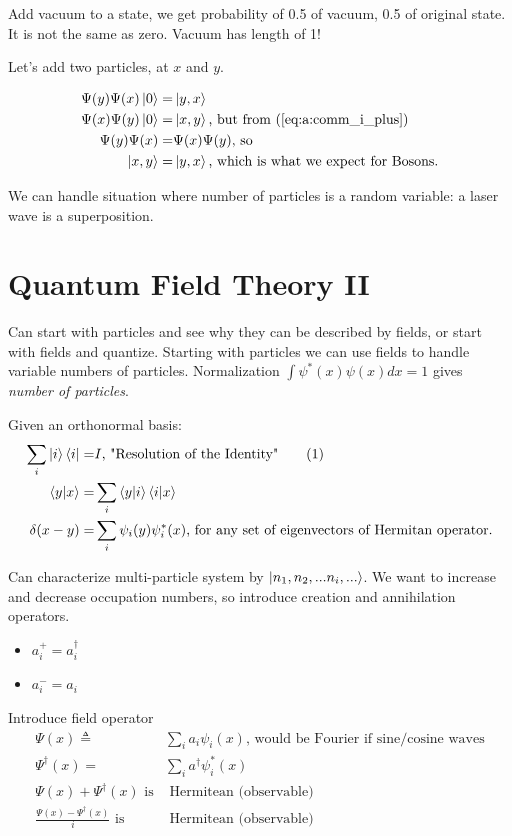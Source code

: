 \documentclass[]{article}
\newcommand\numberthis{\addtocounter{equation}{1}\tag{\theequation}}
\begin{document}
Add vacuum to a state, we get probability of 0.5 of vacuum, 0.5 of original state. It is not the same as zero. Vacuum has length of 1!

Let's add two particles, at $x$ and $y$. 
 
\begin{align*}
\Psi(y)\Psi(x)\ket{0} =& \ket{y,x}\\
\Psi(x)\Psi(y)\ket{0} =& \ket{x,y} \text{, but from (\ref {eq:a:comm_i_plus})}\\
\Psi(y)\Psi(x) =& \Psi(x)\Psi(y) \text{, so}\\
\ket{x,y} =& \ket{y,x} \text{, which is what we expect for Bosons.} 
\end{align*}

We can handle situation where number of particles is a random variable: a laser wave is a superposition.

\section{Quantum Field Theory II}

Can start with particles and see why they can be described by fields, or start with fields and quantize. Starting with particles we can use fields to handle variable numbers of particles. Normalization $\int \psi^*(x) \psi(x) dx=1$ gives \textit{number of particles}.

Given an orthonormal basis:
\begin{align*}
\sum_{i} \ket{i} \bra{i} =& I \text{, "Resolution of the Identity"}\numberthis \label{eq:resolution:identity}\\
\braket{y|x}=& \sum_{i} \braket{y|i} \braket{i|x}\\
\delta(x-y)=& \sum_{i} \psi_i(y) \psi^*_i(x)\text{, for any set of eigenvectors of Hermitan operator.}
\end{align*}

Can characterize multi-particle system by $\ket{n_1, n_2,...n_i,...}$. We want to increase and decrease occupation numbers, so introduce creation and annihilation operators.

\begin{itemize}
	\item $a^+_i=a^\dagger_i$
	\item $a^-_i=a_i$
\end{itemize} 

Introduce field operator
\begin{align*}
\Psi(x) \triangleq & \sum_{i} a_i \psi_i(x) \text{, would be Fourier if sine/cosine waves}\\
\Psi^\dagger(x) =& \sum_{i} a^\dagger \psi^*_i(x)\\
\Psi(x) + \Psi^\dagger(x) \text{ is}& \text{ Hermitean (observable)}\\
\frac{\Psi(x) - \Psi^\dagger(x)}{i} \text{ is}& \text{ Hermitean (observable)}
\end{align*}
\end{document}
